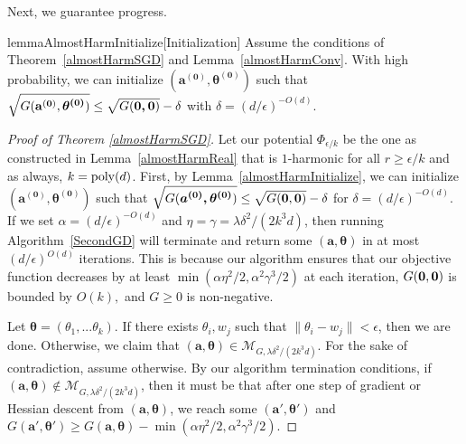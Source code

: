  Next, we guarantee progress.
 \begin{restatable}{lemma}{AlmostHarmInitialize}[Initialization]\label{almostHarmInitialize}
Assume the conditions of Theorem~\ref{almostHarmSGD} and Lemma~\ref{almostHarmConv}. With high probability, we can initialize $\boldsymbol{(a^{(0)},\theta^{(0)})}$ such that $\sqrt{G({\bf a^{(0)}}, \boldsymbol{\theta^{(0)}})} \leq \sqrt{G(\boldsymbol{0,0})} -\delta$ with $\delta = (d/\epsilon)^{ - O(d)}$.
 \end{restatable}
\begin{proof}[Proof of Theorem \ref{almostHarmSGD}]
  Let our potential $\Phi_{\epsilon/k}$ be the one as constructed in Lemma~\ref{almostHarmReal} that is $1$-harmonic for all $r \geq \epsilon/k$ and as always, $k = \mathrm{poly}(d)$.  First, by Lemma~\ref{almostHarmInitialize}, we can initialize $\boldsymbol{(a^{(0)},\theta^{(0)})}$ such that $\sqrt{G(\boldsymbol{a^{(0)},\theta^{(0)}})} \leq \sqrt{G({\bf 0,0})} - \delta$ for $\delta = (d/\epsilon)^{-O(d)}$. If we set $\alpha = (d/\epsilon)^{-O(d)}$ and $\eta = \gamma = \lambda \delta^2/(2k^3d)$, then running Algorithm~\ref{SecondGD} will terminate and return some $(\boldsymbol{a,\theta})$ in at most $(d/\epsilon)^{O(d)}$ iterations. This is because our algorithm ensures that our objective function decreases by at least $\min(\alpha \eta^2/2, \alpha^2\gamma^3/2)$ at each iteration, $G({\bf 0, 0})$ is bounded by $O(k),$ and $G \geq 0$ is non-negative.

Let $\boldsymbol{\theta} = (\theta_1,...\theta_k)$. If there exists $\theta_i, w_j$ such that $\|\theta_i - w_j\| < \epsilon$, then we are done. Otherwise, we claim that $(\boldsymbol{a,\theta}) \in \mathcal{M}_{G,\lambda \delta^2/(2k^3d)}$. For the sake of contradiction, assume otherwise. By our algorithm termination conditions, if $(\boldsymbol{a,\theta}) \not \in \mathcal{M}_{G,\lambda \delta^2/(2k^3d)}$, then it must be that after one step of gradient or Hessian descent from $(\boldsymbol{a,\theta})$, we reach some $(\boldsymbol{a',\theta'})$ and $G(\boldsymbol{a',\theta'}) \geq G(\boldsymbol{a,\theta}) - \min(\alpha\eta^2/2,\alpha^2\gamma^3/2)$.


\end{proof}
